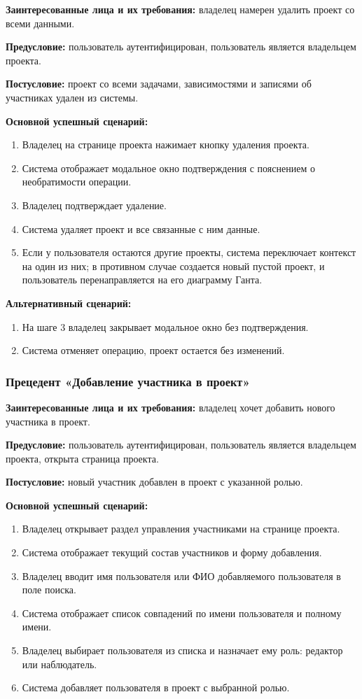 \textbf{Заинтересованные лица и их требования:} владелец намерен удалить проект со всеми данными.

\textbf{Предусловие:} пользователь аутентифицирован, пользователь является владельцем проекта.

\textbf{Постусловие:} проект со всеми задачами, зависимостями и записями об участниках удален из системы.

\textbf{Основной успешный сценарий:}
\begin{enumerate}
    \item Владелец на странице проекта нажимает кнопку удаления проекта.
    \item Система отображает модальное окно подтверждения с пояснением о необратимости операции.
    \item Владелец подтверждает удаление.
    \item Система удаляет проект и все связанные с ним данные.
    \item Если у пользователя остаются другие проекты, система переключает контекст на один из них; в противном случае создается новый пустой проект, и пользователь перенаправляется на его диаграмму Ганта.
\end{enumerate}

\textbf{Альтернативный сценарий:}
\begin{enumerate}
    \item На шаге 3 владелец закрывает модальное окно без подтверждения.
    \item Система отменяет операцию, проект остается без изменений.
\end{enumerate}

\subsubsection{Прецедент «Добавление участника в проект»}

\textbf{Заинтересованные лица и их требования:} владелец хочет добавить нового участника в проект.

\textbf{Предусловие:} пользователь аутентифицирован, пользователь является владельцем проекта, открыта страница проекта.

\textbf{Постусловие:} новый участник добавлен в проект с указанной ролью.

\textbf{Основной успешный сценарий:}
\begin{enumerate}
    \item Владелец открывает раздел управления участниками на странице проекта.
    \item Система отображает текущий состав участников и форму добавления.
    \item Владелец вводит имя пользователя или ФИО добавляемого пользователя в поле поиска.
    \item Система отображает список совпадений по имени пользователя и полному имени.
    \item Владелец выбирает пользователя из списка и назначает ему роль: редактор или наблюдатель.
    \item Система добавляет пользователя в проект с выбранной ролью.
\end{enumerate}

